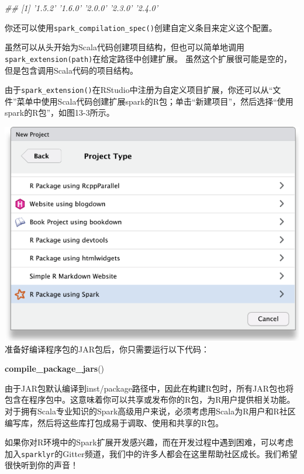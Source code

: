 \documentclass[
]{article}
\newenvironment{Shaded}{\begin{snugshade}}{\end{snugshade}}
\newcommand{\CommentTok}[1]{\textcolor[rgb]{0.56,0.35,0.01}{\textit{#1}}}
\newcommand{\KeywordTok}[1]{\textcolor[rgb]{0.13,0.29,0.53}{\textbf{#1}}}
\newcommand{\NormalTok}[1]{#1}
\begin{document}
\begin{Shaded}
\begin{Highlighting}[]
\CommentTok{## [1] '1.5.2' '1.6.0' '2.0.0' '2.3.0' '2.4.0'}
\end{Highlighting}
\end{Shaded}

你还可以使用\texttt{spark\_compilation\_spec()}创建自定义条目来定义这个配置。

虽然可以从头开始为Scala代码创建项目结构，但也可以简单地调用\texttt{spark\_extension(path)}在给定路径中创建扩展。
虽然这个扩展很可能是空的，但是包含调用Scala代码的项目结构。

由于\texttt{spark\_extension()}在RStudio中注册为自定义项目扩展，你还可以从``文件''菜单中使用Scala代码创建扩展spark的R包；单击``新建项目''，然后选择``使用spark的R包''，如图13-3所示。

\includegraphics{figures/13_3.png}
准备好编译程序包的JAR包后，你只需要运行以下代码：

\begin{Shaded}
\begin{Highlighting}[]
\KeywordTok{compile_package_jars}\NormalTok{()}
\end{Highlighting}
\end{Shaded}

由于JAR包默认编译到inst/package路径中，因此在构建R包时，所有JAR包也将包含在程序包中。这意味着你可以共享或发布你的R包，为R用户提供相关功能。对于拥有Scala专业知识的Spark高级用户来说，必须考虑用Scala为R用户和R社区编写库，然后将这些库打包成易于调取、使用和共享的R包。

如果你对R环境中的Spark扩展开发感兴趣，而在开发过程中遇到困难，可以考虑加入\texttt{sparklyr}的Gitter频道，我们中的许多人都会在这里帮助社区成长。我们希望很快听到你的声音！
\end{document}
